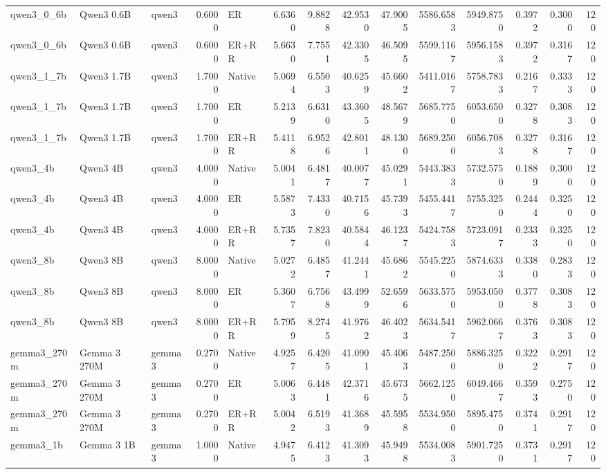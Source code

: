 \begin{tabular}{lllrlrrrrrrrrr}
qwen3_0_6b & Qwen3 0.6B & qwen3 & 0.6000 & ER & 6.6360 & 9.8828 & 42.9530 & 47.9005 & 5586.6583 & 5949.8750 & 0.3972 & 0.3000 & 120 \\
qwen3_0_6b & Qwen3 0.6B & qwen3 & 0.6000 & ER+RR & 5.6630 & 7.7551 & 42.3305 & 46.5095 & 5599.1167 & 5956.1583 & 0.3972 & 0.3167 & 120 \\
qwen3_1_7b & Qwen3 1.7B & qwen3 & 1.7000 & Native & 5.0694 & 6.5503 & 40.6259 & 45.6602 & 5411.0167 & 5758.7833 & 0.2167 & 0.3333 & 120 \\
qwen3_1_7b & Qwen3 1.7B & qwen3 & 1.7000 & ER & 5.2139 & 6.6310 & 43.3605 & 48.5679 & 5685.7750 & 6053.6500 & 0.3278 & 0.3083 & 120 \\
qwen3_1_7b & Qwen3 1.7B & qwen3 & 1.7000 & ER+RR & 5.4118 & 6.9526 & 42.8011 & 48.1300 & 5689.2500 & 6056.7083 & 0.3278 & 0.3167 & 120 \\
qwen3_4b & Qwen3 4B & qwen3 & 4.0000 & Native & 5.0041 & 6.4817 & 40.0077 & 45.0291 & 5443.3833 & 5732.5750 & 0.1889 & 0.3000 & 120 \\
qwen3_4b & Qwen3 4B & qwen3 & 4.0000 & ER & 5.5873 & 7.4330 & 40.7156 & 45.7393 & 5455.4417 & 5755.3250 & 0.2444 & 0.3250 & 120 \\
qwen3_4b & Qwen3 4B & qwen3 & 4.0000 & ER+RR & 5.7357 & 7.8230 & 40.5844 & 46.1237 & 5424.7583 & 5723.0917 & 0.2333 & 0.3250 & 120 \\
qwen3_8b & Qwen3 8B & qwen3 & 8.0000 & Native & 5.0272 & 6.4857 & 41.2441 & 45.6862 & 5545.2250 & 5874.6333 & 0.3380 & 0.2833 & 120 \\
qwen3_8b & Qwen3 8B & qwen3 & 8.0000 & ER & 5.3607 & 6.7568 & 43.4999 & 52.6596 & 5633.5750 & 5953.0500 & 0.3778 & 0.3083 & 120 \\
qwen3_8b & Qwen3 8B & qwen3 & 8.0000 & ER+RR & 5.7959 & 8.2745 & 41.9762 & 46.4023 & 5634.5417 & 5962.0667 & 0.3763 & 0.3083 & 120 \\
gemma3_270m & Gemma 3 270M & gemma3 & 0.2700 & Native & 4.9257 & 6.4205 & 41.0901 & 45.4063 & 5487.2500 & 5886.3250 & 0.3222 & 0.2917 & 120 \\
gemma3_270m & Gemma 3 270M & gemma3 & 0.2700 & ER & 5.0063 & 6.4481 & 42.3716 & 45.6735 & 5662.1250 & 6049.4667 & 0.3593 & 0.2750 & 120 \\
gemma3_270m & Gemma 3 270M & gemma3 & 0.2700 & ER+RR & 5.0042 & 6.5193 & 41.3689 & 45.5958 & 5534.9500 & 5895.4750 & 0.3741 & 0.2917 & 120 \\
gemma3_1b & Gemma 3 1B & gemma3 & 1.0000 & Native & 4.9475 & 6.4123 & 41.3093 & 45.9498 & 5534.0083 & 5901.7250 & 0.3731 & 0.2917 & 120 \\

\end{tabular}
